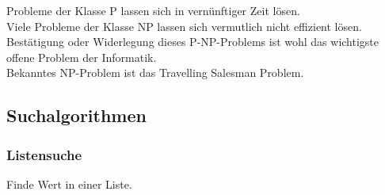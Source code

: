 Probleme der Klasse P lassen sich in vernünftiger Zeit lösen. \\
Viele Probleme der Klasse NP lassen sich vermutlich nicht effizient lösen.\\
Bestätigung oder Widerlegung dieses P-NP-Problems ist wohl das wichtigste offene Problem der Informatik.\\
Bekanntes NP-Problem ist das Travelling Salesman Problem.\\


\subsection{Suchalgorithmen}
\subsubsection{Listensuche}
Finde Wert in einer Liste.\\

